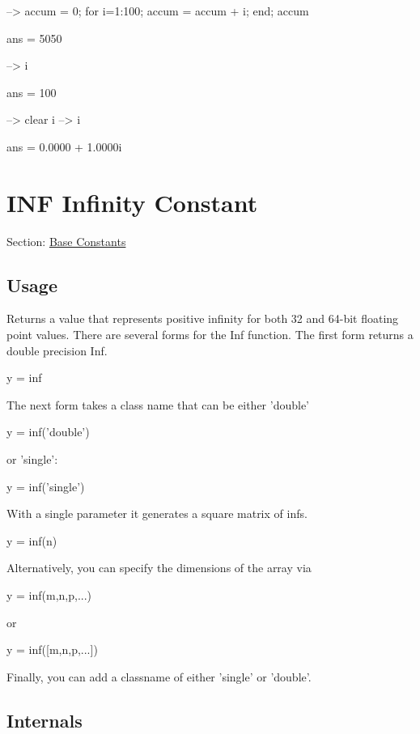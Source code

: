 \begin{DoxyVerbInclude}
--> accum = 0; for i=1:100; accum = accum + i; end; accum

ans = 
 5050 

--> i

ans = 
 100 

--> clear i
--> i

ans = 
   0.0000 +  1.0000i 
\end{DoxyVerbInclude}
 \hypertarget{constants_inf}{}\section{I\-N\-F Infinity Constant}\label{constants_inf}
Section\-: \hyperlink{sec_constants}{Base Constants} \hypertarget{vtkwidgets_vtkxyplotwidget_Usage}{}\subsection{Usage}\label{vtkwidgets_vtkxyplotwidget_Usage}
Returns a value that represents positive infinity for both 32 and 64-\/bit floating point values. There are several forms for the {\ttfamily Inf} function. The first form returns a double precision {\ttfamily Inf}. \begin{DoxyVerb}   y = inf
\end{DoxyVerb}
 The next form takes a class name that can be either {\ttfamily 'double'} \begin{DoxyVerb}   y = inf('double')
\end{DoxyVerb}
 or {\ttfamily 'single'}\-: \begin{DoxyVerb}   y = inf('single')
\end{DoxyVerb}
 With a single parameter it generates a square matrix of {\ttfamily inf}s. \begin{DoxyVerb}   y = inf(n)
\end{DoxyVerb}
 Alternatively, you can specify the dimensions of the array via \begin{DoxyVerb}   y = inf(m,n,p,...)
\end{DoxyVerb}
 or \begin{DoxyVerb}   y = inf([m,n,p,...])
\end{DoxyVerb}
 Finally, you can add a classname of either {\ttfamily 'single'} or {\ttfamily 'double'}. \hypertarget{transforms_svd_Function}{}\subsection{Internals}\label{transforms_svd_Function}
